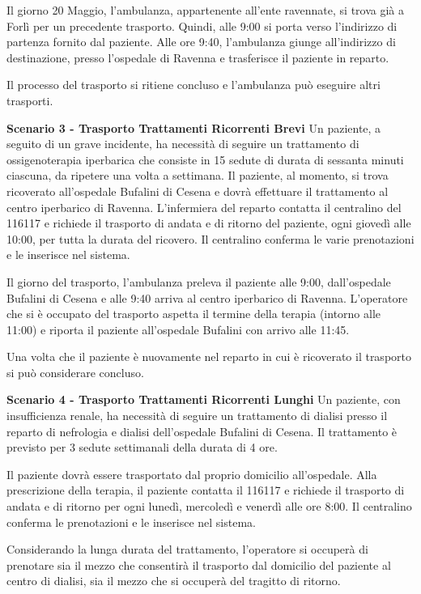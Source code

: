 \documentclass[12pt]{article}
\begin{document}
Il giorno 20 Maggio, l'ambulanza, appartenente all'ente ravennate, si trova già a Forlì per un precedente trasporto. Quindi, alle 9:00 si porta verso l'indirizzo di partenza fornito dal paziente.
Alle ore 9:40, l'ambulanza giunge all'indirizzo di destinazione, presso l'ospedale di Ravenna e trasferisce il paziente in reparto. 

Il processo del trasporto si ritiene concluso e l'ambulanza può eseguire altri trasporti.

\hfill \break
\textbf{Scenario 3 - Trasporto Trattamenti Ricorrenti Brevi}
Un paziente, a seguito di un grave incidente, ha necessità di seguire un trattamento di ossigenoterapia iperbarica che consiste in 15 sedute di durata di sessanta minuti ciascuna, da ripetere una volta a settimana.
Il paziente, al momento, si trova ricoverato all'ospedale Bufalini di Cesena e dovrà effettuare il trattamento al centro iperbarico di Ravenna.
L'infermiera del reparto contatta il centralino del 116117 e richiede il trasporto di andata e di ritorno del paziente, ogni giovedì alle 10:00, per tutta la durata del ricovero.
Il centralino conferma le varie prenotazioni e le inserisce nel sistema.

Il giorno del trasporto, l'ambulanza preleva il paziente alle 9:00, dall'ospedale Bufalini di Cesena e alle 9:40 arriva al centro iperbarico di Ravenna.
L'operatore che si è occupato del trasporto aspetta il termine della terapia (intorno alle 11:00) e riporta il paziente all'ospedale Bufalini con arrivo alle 11:45.

Una volta che il paziente è nuovamente nel reparto in cui è ricoverato il trasporto si può considerare concluso.

\hfill \break
\textbf{Scenario 4 - Trasporto Trattamenti Ricorrenti Lunghi}
Un paziente, con insufficienza renale, ha necessità di seguire un trattamento di dialisi presso il reparto di nefrologia e dialisi dell'ospedale Bufalini di Cesena. Il trattamento è previsto per 3 sedute settimanali della durata di 4 ore.

Il paziente dovrà essere trasportato dal proprio domicilio all'ospedale.
Alla prescrizione della terapia, il paziente contatta il 116117 e richiede il trasporto di andata e di ritorno per ogni lunedì, mercoledì e venerdì alle ore 8:00.
Il centralino conferma le prenotazioni e le inserisce nel sistema.

Considerando la lunga durata del trattamento, l'operatore si occuperà di prenotare sia il mezzo che consentirà il trasporto dal domicilio del paziente al centro di dialisi, sia il mezzo che si occuperà del tragitto di ritorno.
\end{document}
